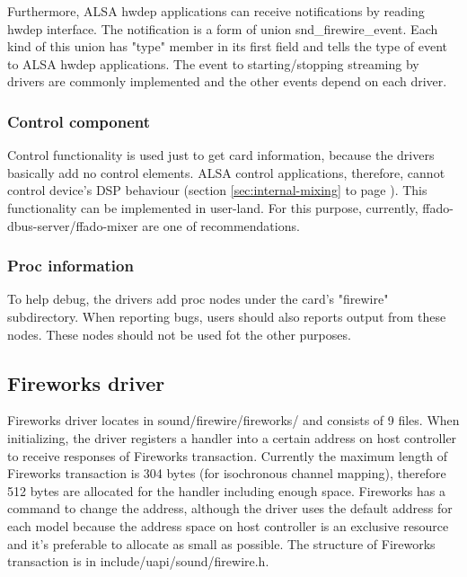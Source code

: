 \documentclass[onecolumn]{jarticle}
\begin{document}
Furthermore, ALSA hwdep applications can receive notifications by reading hwdep interface. The notification is a form of union snd\_firewire\_event. Each kind of this union has "type" member in its first field and tells the type of event to ALSA hwdep applications. The event to starting/stopping streaming by drivers are commonly implemented and the other events depend on each driver.

\subsubsection{Control component}
Control functionality is used just to get card information, because the drivers basically add no control elements. ALSA control applications, therefore, cannot control device's DSP behaviour (section \ref{sec:internal-mixing} to page \pageref{sec:internal-mixing}). This functionality can be implemented in user-land. For this purpose, currently, ffado-dbus-server/ffado-mixer are one of recommendations.

\subsubsection{Proc information}

To help debug, the drivers add proc nodes under the card's "firewire" subdirectory. When reporting bugs, users should also reports output from these nodes. These nodes should not be used fot the other purposes.


\subsection{Fireworks driver}

Fireworks driver locates in sound/firewire/fireworks/ and consists of 9 files. When initializing, the driver registers a handler into a certain address on host controller to receive responses of Fireworks transaction. Currently the maximum length of Fireworks transaction is 304 bytes (for isochronous channel mapping), therefore 512 bytes are allocated for the handler including enough space. Fireworks has a command to change the address, although the driver uses the default address for each model because the address space on host controller is an exclusive resource and it's preferable to allocate as small as possible. The structure of Fireworks transaction is in include/uapi/sound/firewire.h.
\end{document}
